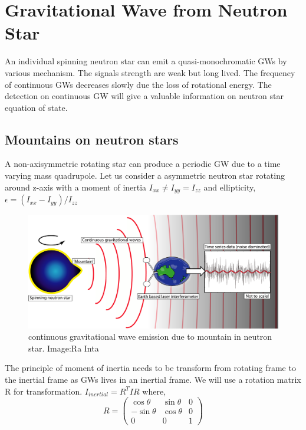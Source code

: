 \documentclass{ttuthes2007}
\begin{document}
\section{Gravitational Wave from Neutron Star}
An individual spinning neutron star can emit a quasi-monochromatic \acp{GW} by
various mechanism. The signals strength are weak but long lived. The frequency
of continuous \acp{GW} decreases slowly due the loss of rotational energy. The
detection on continuous \ac{GW} will give a valuable information on neutron star
equation of state.
\subsection{Mountains on neutron stars}
A non-axisymmetric rotating star can produce a periodic \ac{GW} due to a time
varying mass quadrupole. Let us consider a asymmetric neutron star rotating
around z-axis with a moment of inertia $I_{xx}\neq I_{yy}=I_{zz}$ and
ellipticity,$\epsilon=(I_{xx}-I_{yy})/I_{zz}$

\begin{figure}[h!]                                                            
        \includegraphics[width=\textwidth]{figure/CW.png}                 
        \caption{continuous gravitational wave emission due to mountain in
neutron star. Image:Ra Inta}
        \label{fig:CW}                                                 
\end{figure}     

The principle of moment of inertia needs to be transform from rotating frame to 
the inertial frame as \acp{GW} lives in an inertial frame. We will use a rotation
matrix R for transformation.
$I_{inertial}= R^T I R$
where, 
\begin{equation}
R=
\begin{pmatrix}
\cos\theta & \sin\theta & 0 \\
-\sin\theta & \cos\theta & 0 \\
0 & 0 & 1
\end{pmatrix}
\end{equation}
\end{document}
